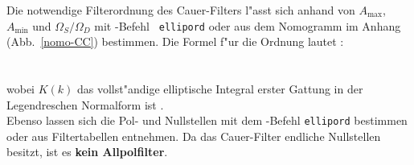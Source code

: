 \subsubsection{{}}
Die notwendige Filterordnung des Cauer-Filters l"asst sich anhand von
$A_{\max}$, $A_{\min}$ und $\Omega_S/\Omega_D$ mit \matlogo-Befehl {\tt
  ellipord} oder aus dem Nomogramm im Anhang
(Abb.~\ref{nomo-CC}) bestimmen. Die Formel f"ur die Ordnung lautet \cite{ING:PRO:97}:\\
\\~\\
wobei $K(k)$ das vollst"andige elliptische Integral erster Gattung in der Legendreschen Normalform ist \cite{BRO:SEM:91}.\\
\nit Ebenso lassen sich die Pol- und
Nullstellen mit dem \matlogo-Befehl {\tt ellipord} bestimmen oder aus Filtertabellen entnehmen.
Da das Cauer-Filter endliche Nullstellen besitzt, ist es {\bf kein
  Allpolfilter}.

